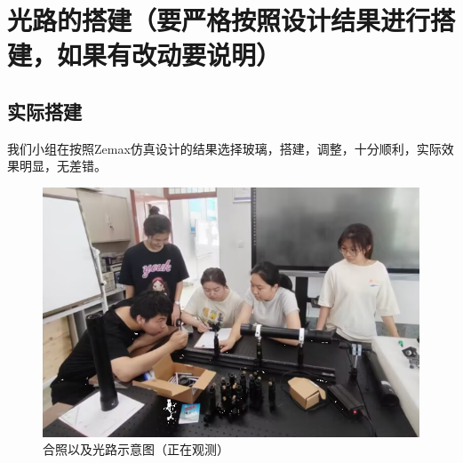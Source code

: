 \documentclass{article}
\begin{document}
\section{光路的搭建（要严格按照设计结果进行搭建，如果有改动要说明）}
\subsection{实际搭建}
我们小组在按照Zemax仿真设计的结果选择玻璃，搭建，调整，十分顺利，实际效果明显，无差错。
\begin{figure}[H]
  \centering
  \includegraphics[width=16cm]{img/24.png}
  \caption{合照以及光路示意图（正在观测）}
\end{figure}
\end{document}
